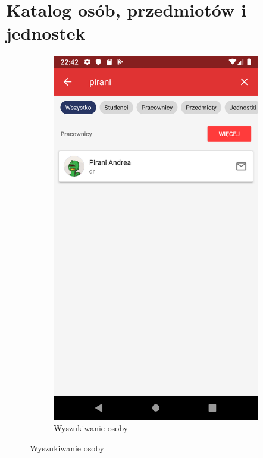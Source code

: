 \documentclass{pracamgr}
\begin{document}
\section{Katalog osób, przedmiotów i jednostek}

\begin{figure}[p]
	\centering
	\begin{subfigure}[t]{0.3\textwidth}
		\includegraphics[width=\textwidth]{img/search_pirani.png}
		\caption{Wyszukiwanie osoby}
		\label{fig:search_pirani}

\end{subfigure}
\end{figure}
\end{document}
